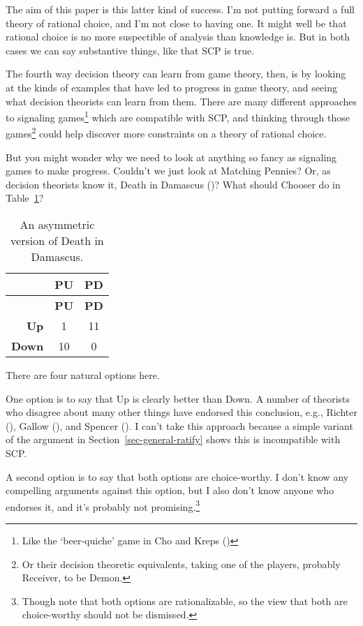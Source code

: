 \documentclass[
  10pt,
  letterpaper,
  DIV=11,
  numbers=noendperiod,
  twoside]{scrartcl}
\begin{document}
The aim of this paper is this latter kind of success. I'm not putting
forward a full theory of rational choice, and I'm not close to having
one. It might well be that rational choice is no more suspectible of
analysis than knowledge is. But in both cases we can say substantive
things, like that SCP is true.

The fourth way decision theory can learn from game theory, then, is by
looking at the kinds of examples that have led to progress in game
theory, and seeing what decision theorists can learn from them. There
are many different approaches to signaling games\footnote{Like the
  `beer-quiche' game in Cho and Kreps
  ()} which are compatible with SCP,
and thinking through those games\footnote{Or their decision theoretic
  equivalents, taking one of the players, probably Receiver, to be
  Demon.} could help discover more constraints on a theory of rational
choice.

But you might wonder why we need to look at anything so fancy as
signaling games to make progress. Couldn't we just look at Matching
Pennies? Or, as decision theorists know it, Death in Damascus
()? What should
Chooser do in Table~\ref{tbl-mean-demon}?

\begin{longtable}[]{@{}rcc@{}}
\caption{An asymmetric version of Death in
Damascus.}\label{tbl-mean-demon}\tabularnewline
\toprule\noalign{}
& \textbf{PU} & \textbf{PD} \\
\midrule\noalign{}
\endfirsthead
\toprule\noalign{}
& \textbf{PU} & \textbf{PD} \\
\midrule\noalign{}
\endhead
\bottomrule\noalign{}
\endlastfoot
\textbf{Up} & 1 & 11 \\
\textbf{Down} & 10 & 0 \\
\end{longtable}

There are four natural options here.

One option is to say that Up is clearly better than Down. A number of
theorists who disagree about many other things have endorsed this
conclusion, e.g., Richter (), Gallow
(), and Spencer
(). I can't take this approach because
a simple variant of the argument in Section~\ref{sec-general-ratify}
shows this is incompatible with SCP.

A second option is to say that both options are choice-worthy. I don't
know any compelling arguments against this option, but I also don't know
anyone who endorses it, and it's probably not promising.\footnote{Though
  note that both options are rationalizable, so the view that both are
  choice-worthy should not be dismissed.}
\end{document}
